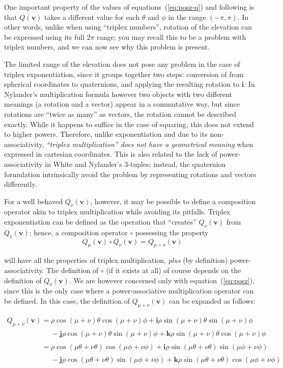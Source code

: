 \documentclass{article}
\let\vec\mathbf
\newcommand{\mathnewline}[1][\quad]{\\\phantom{#1}}
\newcommand{\mathnewlineeq}[1][\quad]{\\\phantom{#1 = }}
\begin{document}
One important property of the values of equations~(\ref{eq:posz-q})
and following is that $Q(\vec{v})$ takes a different value for each
$\theta$ and $\phi$ in the range $(-\pi, \pi)$.  In other words,
unlike when using ``triplex numbers'', rotation of the elevation can
be expressed using its full $2\pi$ range; you may recall this to be a
problem with triplex numbers, and we can now see why this problem is
present.

The limited range of the elevation does not pose any problem in the
case of triplex exponentiation, since it groups together two steps:
conversion of from spherical coordinates to quaternions, and applying
the resulting rotation to $\vec{i}$.  In Nylander's multiplication
formula however two objects with two different meanings (a rotation
and a vector) appear in a commutative way, but since rotations are
``twice as many'' as vectors, the rotation cannot be described
exactly.  While it happens to suffice in the case of squaring, this
does not extend to higher powers.  Therefore, unlike exponentiation
and due to its non-associativity, \emph{``triplex multiplication''
  does not have a geometrical meaning} when expressed in cartesian
coordinates.  This is also related to the lack of power-associativity
in White and Nylander's 3-tuples; instead, the quaternion formulation
intrinsically avoid the problem by representing rotations and vectors
differently.

For a well behaved $Q_\nu(\vec{v})$, however, it may be possible to
define a composition operator akin to triplex multiplication while
avoiding its pitfalls.  Triplex exponentiation can be defined as
the operation that ``creates'' $Q_\nu(\vec{v})$ from $Q_1(\vec{v})$;
hence, a composition operator $\circ$ possessing the property
\begin{equation*}
  Q_\mu(\vec{v}) \circ Q_\nu(\vec{v}) = Q_{\mu+\nu}(\vec{v})
\end{equation*}

\noindent
will have all the properties of triplex multiplication, \emph{plus}
(by definition) power-associativity.  The definition of $\circ$ (if it
exists at all) of course depends on the definition of
$Q_\nu(\vec{v})$.  We are however concerned only with
equation~(\ref{eq:posz}), since this is the only case where a
power-associative multiplication operator can be defined.  In this
case, the definition of $Q_{\mu+\nu}(\vec{v})$ can be expanded as
follows:

\begin{equation*}
  \begin{array}{l}
  Q_{\mu+\nu}(\vec{v}) = \rho \cos (\mu+\nu)\theta \cos (\mu+\nu)\phi + \vec{i} \rho \sin (\mu+\nu)\theta \sin (\mu+\nu)\phi
  \mathnewlineeq[Q_{\mu+\nu}(\vec{v})] - \vec{j} \rho \cos (\mu+\nu)\theta \sin (\mu+\nu)\phi + \vec{k} \rho \sin (\mu+\nu)\theta \cos (\mu+\nu)\phi
  \mathnewline[Q_{\mu+\nu}(\vec{v})] = \rho \cos (\mu\theta+\nu\theta) \cos (\mu\phi+\nu\phi) + \vec{i} \rho \sin (\mu\theta+\nu\theta) \sin (\mu\phi+\nu\phi)
  \mathnewlineeq[Q_{\mu+\nu}(\vec{v})] - \vec{j} \rho \cos (\mu\theta+\nu\theta) \sin (\mu\phi+\nu\phi) + \vec{k} \rho \sin (\mu\theta+\nu\theta) \cos (\mu\phi+\nu\phi)
  \end{array}
\end{equation*}
\end{document}
